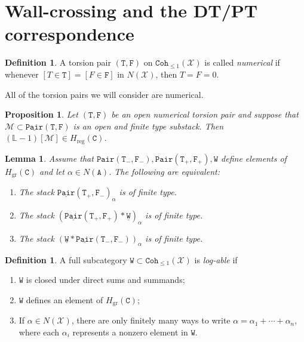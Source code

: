 \documentclass{amsart}
\newtheorem{prop}[thm]{Proposition}
\newtheorem{lem}[thm]{Lemma}
\theoremstyle{definition}
\newtheorem{defn}[thm]{Definition}
\theoremstyle{remark}
\theoremstyle{plain}
\theoremstyle{definition}
\theoremstyle{remark}
\renewcommand{\L}{\mathbb{L}}
\newcommand{\mc}[1]{\mathcal{#1}}
\newcommand{\mr}[1]{\mathrm{#1}}
\newcommand{\mt}[1]{\mathtt{#1}}
\newcommand{\ul}[1]{\underline{#1}}
\newcommand{\1}{\mathbf{1}}
\newcommand{\2}{\mathbf{2}}
\newcommand{\3}{\mathbf{3}}
\begin{document}
\section{Wall-crossing and the DT/PT correspondence}

\begin{defn}
    A torsion pair $(\mt{T}, \mt{F})$ on $\mt{Coh}_{\leq 1}(\mc{X})$ is called \textit{numerical} if whenever $[T \in \mt{T}] = [F \in \mt{F}]$ in $N(\mc{X})$, then $T = F = 0$.
\end{defn}
All of the torsion pairs we will consider are numerical.

\begin{prop}
    Let $(\mt{T}, \mt{F})$ be an open numerical torsion pair and suppose that $\mc{M} \subset \mt{\ul{Pair}(T,F)}$ is an open and finite type substack. Then $(\L - 1) [\mc{M}] \in H_{\mr{reg}}(\mt{C})$.
\end{prop}

\begin{lem}
    Assume that $\mt{Pair(T_-, F_-)}, \mt{Pair(T_+, F_+)}, \mt{W}$ define elements of $H_{\mr{gr}}(\mt{C})$ and let $\alpha \in N(\mt{A})$. The following are equivalent:
    \begin{enumerate}
        \item The stack $\mt{\ul{Pair}(T_+, F_-)}_{\alpha}$ is of finite type.
        \item The stack $(\mt{\ul{Pair}(T_+, F_+)} * \mt{\ul{W}})_{\alpha}$ is of finite type.
        \item The stack $(\mt{\ul{W}} * \mt{\ul{Pair}(T_-, F_-)})_{\alpha}$ is of finite type.
    \end{enumerate}
\end{lem}

\begin{defn}
    A full subcategory $\mt{W} \subset \mt{Coh}_{\leq 1}(\mc{X})$ is \textit{log-able} if
    \begin{enumerate}
        \item $\mt{W}$ is closed under direct sums and summands;
        \item $\mt{W}$ defines an element of $H_{\mr{gr}}(\mt{C})$;
        \item If $\alpha \in N(\mc{X})$, there are only finitely many ways to write $\alpha = \alpha_1 + \cdots + \alpha_n$, where each $\alpha_i$ represents a nonzero element in $\mt{W}$.
    \end{enumerate}
\end{defn}
\end{document}
